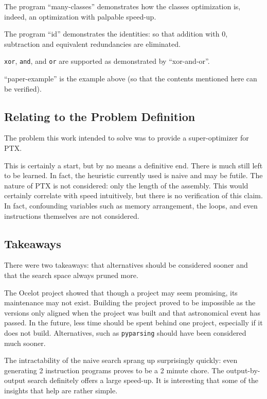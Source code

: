 \documentclass[letterpaper,twocolumn,10pt]{article}
\begin{document}
The program ``many-classes'' demonstrates how the classes optimization is, indeed,
an optimization with palpable speed-up.

The program ``id'' demonstrates the identities: so that addition with 0, subtraction
and equivalent redundancies are eliminated.

\texttt{xor}, \texttt{and}, and \texttt{or} are supported as demonstrated by
``xor-and-or''.

``paper-example'' is the example above (so that the contents mentioned here can
be verified).

\subsection{Relating to the Problem Definition}

The problem this work intended to solve was to provide a super-optimizer for PTX.

This is certainly a start, but by no means a definitive end. There is much still left to
be learned. In fact, the heuristic currently used is naive and may be futile. The nature
of PTX is not considered: only the length of the assembly. This would certainly correlate
with speed intuitively, but there is no verification of this claim. In fact, confounding
variables such as memory arrangement, the loops, and even instructions themselves are not
considered.

\subsection{Takeaways}

There were two takeaways: that alternatives should be considered sooner and that
the search space always pruned more.

The Ocelot project \cite{GPUOcelot} showed that though a project may seem promising,
its maintenance may not exist. Building the project proved to be impossible as the versions
only aligned when the project was built and that astronomical event has passed.
In the future, less time should be spent behind one project, especially if it does not build.
Alternatives, such as \texttt{pyparsing} should have been considered much sooner.

The intractability of the naive search sprang up surprisingly quickly: even generating 2
instruction programs proves to be a 2 minute chore. The output-by-output search definitely
offers a large speed-up. It is interesting that some of the insights that help are rather
simple.
\end{document}
